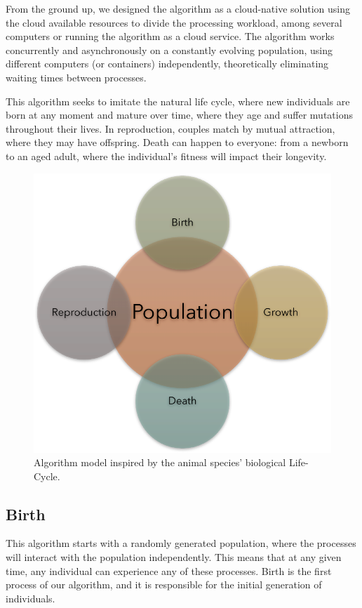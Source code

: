 \documentclass[runningheads]{llncs}
\begin{document}
From the ground up, we designed the algorithm as a cloud-native solution using
the cloud available resources to divide the processing workload, among several
computers or running the algorithm as a cloud service. The algorithm works
concurrently and asynchronously on a constantly evolving population, using
different computers (or containers) independently, theoretically eliminating
waiting times between processes.

This algorithm seeks to imitate the natural life cycle, where new individuals
are born at any moment and mature over time, where they age and suffer
mutations throughout their lives. In reproduction, couples match by mutual
attraction, where they may have offspring. Death can happen to everyone: from a
newborn to an aged adult, where the individual's fitness will impact their
longevity.

\begin{figure}
    \includegraphics[width=\textwidth]{img/fig2_proposal.pdf}
    \caption{Algorithm model inspired by the animal species' biological Life-Cycle.} \label{fig2}
    \end{figure}

\subsection{Birth}

This algorithm starts with a randomly generated population, where the processes
will interact with the population independently. This means that at any given
time, any individual can experience any of these processes. Birth is the first
process of our algorithm, and it is responsible for the initial generation of
individuals.
\end{document}
